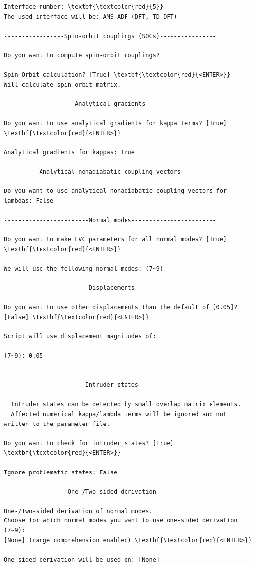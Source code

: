 \documentclass[a4paper,11pt,DIV=15,openany]{scrbook}
\begin{document}
\begin{oframed}
\begin{Verbatim}[commandchars=\\\{\}]
Interface number: \textbf{\textcolor{red}{5}}
The used interface will be: AMS_ADF (DFT, TD-DFT)

-----------------Spin-orbit couplings (SOCs)----------------

Do you want to compute spin-orbit couplings?

Spin-Orbit calculation? [True] \textbf{\textcolor{red}{<ENTER>}}
Will calculate spin-orbit matrix.

--------------------Analytical gradients--------------------

Do you want to use analytical gradients for kappa terms? [True] \textbf{\textcolor{red}{<ENTER>}}

Analytical gradients for kappas: True

----------Analytical nonadiabatic coupling vectors----------

Do you want to use analytical nonadiabatic coupling vectors for lambdas: False

------------------------Normal modes------------------------

Do you want to make LVC parameters for all normal modes? [True] \textbf{\textcolor{red}{<ENTER>}}

We will use the following normal modes: (7~9)

------------------------Displacements-----------------------

Do you want to use other displacements than the default of [0.05]? [False] \textbf{\textcolor{red}{<ENTER>}}

Script will use displacement magnitudes of:

(7~9): 0.05
 

-----------------------Intruder states----------------------

  Intruder states can be detected by small overlap matrix elements.
  Affected numerical kappa/lambda terms will be ignored and not written to the parameter file.

Do you want to check for intruder states? [True] \textbf{\textcolor{red}{<ENTER>}}

Ignore problematic states: False

------------------One-/Two-sided derivation-----------------

One-/Two-sided derivation of normal modes.
Choose for which normal modes you want to use one-sided derivation (7~9): 
[None] (range comprehension enabled) \textbf{\textcolor{red}{<ENTER>}}

One-sided derivation will be used on: [None]



\end{Verbatim}
\end{oframed}
\end{document}

